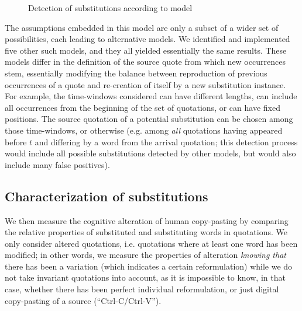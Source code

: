 \begin{figure}[h]
    \centering
    \def\svgwidth{\textwidth}
    \small
    
    \caption{Detection of substitutions according to model }
    \label{fig:model-slidetimebags}
\end{figure}

The assumptions embedded in this model are only a subset of a wider set of possibilities, each leading to alternative models.
We identified and implemented five other such models, and they all yielded essentially the same results.
These models differ in the definition of the source quote from which new occurrences stem, essentially modifying the balance between reproduction of previous occurrences of a quote and re-creation of itself by a new substitution instance.
For example, the time-windows considered can have different lengths, can include all occurrences from the beginning of the set of quotations, or can have fixed positions.
The source quotation of a potential substitution can be chosen among those time-windows, or otherwise (e.g. among \emph{all} quotations having appeared before $t$ and differing by a word from the arrival quotation; this detection process would include all possible substitutions detected by other models, but would also include many false positives).

\subsection{Characterization of substitutions}

We then measure the cognitive alteration of human copy-pasting by comparing the relative properties of substituted and substituting words in quotations.  We only consider altered quotations, \hbox{i.e.} quotations where at least one word has been modified; in other words, we measure the properties of alteration \emph{knowing that} there has been a variation (which indicates a certain reformulation) while we do not take invariant quotations into account, as it is impossible to know, in that case, whether there has been perfect individual reformulation, or just digital copy-pasting of a source (``{\sf Ctrl-C}/{\sf Ctrl-V}'').

